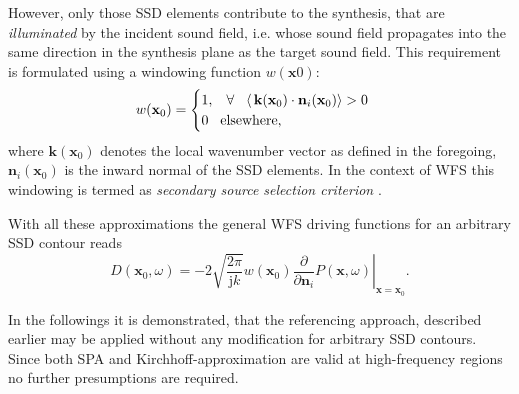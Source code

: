 \documentclass[12pt,a4paper]{article}
\newcommand{\ti}{\mathrm{j}}
\newcommand{\vx}{\mathbf{x}}
\newcommand{\vxo}{\mathbf{x}_0}
\begin{document}
However, only those SSD elements contribute to the synthesis, that are \emph{illuminated} by the incident sound field, i.e. whose sound field propagates into the same direction in the synthesis plane as the target sound field. This requirement is formulated using a windowing function $w(\vx0)$:
%
\begin{equation}
w(\vxo) = \begin{cases}
                        1, \hspace{3mm} \forall \hspace{3mm} \langle\, \mathbf{k}(\vxo) \cdot \mathbf{n}_i(\vxo)\rangle > 0 \\
                        0  \hspace{3mm} \text{elsewhere},
                    \end{cases}
\end{equation}
where $\mathbf{k}(\vxo)$ denotes the local wavenumber vector as defined in the foregoing, $ \mathbf{n}_i(\vxo)$ is the inward normal of the SSD elements. %
In the context of WFS this windowing is termed as \emph{secondary source selection criterion} \cite{Spors2007, Spors2007:DAGA:SS_selection_criterion}.

With all these approximations the general WFS driving functions for an arbitrary SSD contour reads
\begin{equation}
D(\vxo,\omega) = -2 \sqrt{\frac{2\pi}{\ti k}} w(\vxo) \left. \frac{\partial}{\partial \mathbf{n}_i} P(\vx,\omega) \right|_{\vx = \vxo}.
\end{equation}

\vspace{3mm}
In the followings it is demonstrated, that the referencing approach, described earlier may be applied without any modification for arbitrary SSD contours. 
Since both SPA and Kirchhoff-approximation are valid at high-frequency regions no further presumptions are required.
\end{document}
